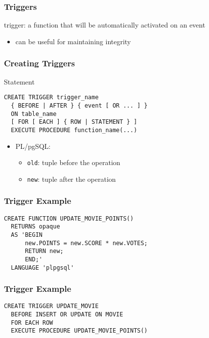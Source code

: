\documentclass[dvipsnames]{beamer}
\theoremstyle{plain}
\begin{document}
\begin{frame}
  \frametitle{Triggers}

  \begin{definition}
    \alert{trigger}: a function that will be automatically activated on an event
  \end{definition}

  \begin{itemize}
    \item can be useful for maintaining integrity
  \end{itemize}
\end{frame}

\begin{frame}[fragile]
  \frametitle{Creating Triggers}

  \begin{block}{Statement}
    \begin{lstlisting}[language=ExtendedSQL]
CREATE TRIGGER trigger_name
  { BEFORE | AFTER } { event [ OR ... ] }
  ON table_name
  [ FOR [ EACH ] { ROW | STATEMENT } ]
  EXECUTE PROCEDURE function_name(...)
    \end{lstlisting}
  \end{block}

  \pause
  \begin{itemize}
    \item PL/pgSQL:
    \begin{itemize}
      \item \lstinline!old!: tuple before the operation
      \item \lstinline!new!: tuple after the operation
    \end{itemize}
  \end{itemize}
\end{frame}

\begin{frame}[fragile]
  \frametitle{Trigger Example}

  \begin{example}
    \begin{lstlisting}[language=ExtendedSQL]
CREATE FUNCTION UPDATE_MOVIE_POINTS()
  RETURNS opaque
  AS 'BEGIN
      new.POINTS = new.SCORE * new.VOTES;
      RETURN new;
      END;'
  LANGUAGE 'plpgsql'
    \end{lstlisting}
  \end{example}
\end{frame}

\begin{frame}[fragile]
  \frametitle{Trigger Example}

  \begin{example}
    \begin{lstlisting}[language=ExtendedSQL]
CREATE TRIGGER UPDATE_MOVIE
  BEFORE INSERT OR UPDATE ON MOVIE
  FOR EACH ROW
  EXECUTE PROCEDURE UPDATE_MOVIE_POINTS()
    \end{lstlisting}
  \end{example}
\end{frame}
\end{document}
